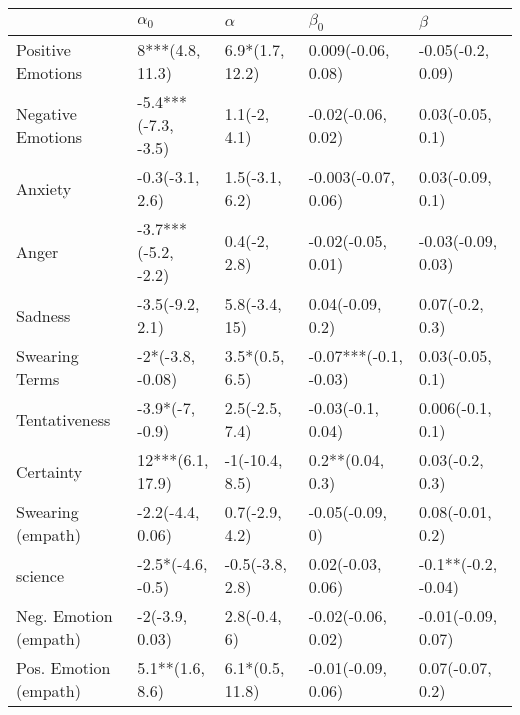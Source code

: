 \begin{tabular}{lllll}
\toprule
{} &           $\alpha_0$ &         $\alpha$ &              $\beta_0$ &              $\beta$ \\
\midrule
Positive Emotions     &      8***(4.8, 11.3) &  6.9*(1.7, 12.2) &     0.009(-0.06, 0.08) &    -0.05(-0.2, 0.09) \\
Negative Emotions     &  -5.4***(-7.3, -3.5) &     1.1(-2, 4.1) &     -0.02(-0.06, 0.02) &     0.03(-0.05, 0.1) \\
Anxiety               &      -0.3(-3.1, 2.6) &   1.5(-3.1, 6.2) &    -0.003(-0.07, 0.06) &     0.03(-0.09, 0.1) \\
Anger                 &  -3.7***(-5.2, -2.2) &     0.4(-2, 2.8) &     -0.02(-0.05, 0.01) &   -0.03(-0.09, 0.03) \\
Sadness               &      -3.5(-9.2, 2.1) &    5.8(-3.4, 15) &       0.04(-0.09, 0.2) &      0.07(-0.2, 0.3) \\
Swearing Terms        &     -2*(-3.8, -0.08) &   3.5*(0.5, 6.5) &  -0.07***(-0.1, -0.03) &     0.03(-0.05, 0.1) \\
Tentativeness         &      -3.9*(-7, -0.9) &   2.5(-2.5, 7.4) &      -0.03(-0.1, 0.04) &     0.006(-0.1, 0.1) \\
Certainty             &     12***(6.1, 17.9) &   -1(-10.4, 8.5) &       0.2**(0.04, 0.3) &      0.03(-0.2, 0.3) \\
Swearing (empath)     &     -2.2(-4.4, 0.06) &   0.7(-2.9, 4.2) &        -0.05(-0.09, 0) &     0.08(-0.01, 0.2) \\
science               &    -2.5*(-4.6, -0.5) &  -0.5(-3.8, 2.8) &      0.02(-0.03, 0.06) &  -0.1**(-0.2, -0.04) \\
Neg. Emotion (empath) &       -2(-3.9, 0.03) &     2.8(-0.4, 6) &     -0.02(-0.06, 0.02) &   -0.01(-0.09, 0.07) \\
Pos. Emotion (empath) &      5.1**(1.6, 8.6) &  6.1*(0.5, 11.8) &     -0.01(-0.09, 0.06) &     0.07(-0.07, 0.2) \\
\bottomrule
\end{tabular}
